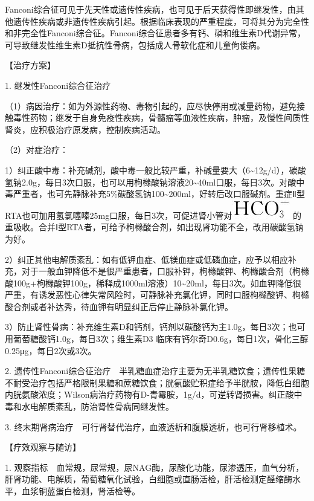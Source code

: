 Fanconi综合征可见于先天性或遗传性疾病，也可见于后天获得性即继发性，由其他遗传性疾病或非遗传性疾病引起。根据临床表现的严重程度，可将其分为完全性和非完全性Fanconi综合征。Fanconi综合征患者多有钙、磷和维生素D代谢异常，可导致继发性维生素D抵抗性骨病，包括成人骨软化症和儿童佝偻病。

【治疗方案】

1. 继发性Fanconi综合征治疗

（1）病因治疗：如为外源性药物、毒物引起的，应尽快停用或减量药物，避免接触毒性药物；继发于自身免疫性疾病，骨髓瘤等血液性疾病，肿瘤，及慢性间质性肾炎，应积极治疗原发病，控制疾病活动。

（2）对症治疗：

1）纠正酸中毒：补充碱剂，酸中毒一般比较严重，补碱量要大（6\textasciitilde{}12g/d），碳酸氢钠2.0g，每日3次口服，也可以用枸橼酸钠溶液20\textasciitilde{}40ml口服，每日3次。对酸中毒严重者，也可先静脉补充5\%碳酸氢钠100\textasciitilde{}200ml，好转后改口服碱剂。重症Ⅱ型RTA也可加用氢氯噻嗪25mg口服，每日3次，可促进肾小管对\includegraphics{./images/Image00128.jpg}
的重吸收。合并Ⅰ型RTA者，可给予枸橼酸合剂，如出现肾功能不全，改用碳酸氢钠为好。

2）纠正其他电解质紊乱：如有低钾血症、低镁血症或低磷血症，应予以相应补充，对于一般血钾降低不是很严重患者，口服补钾，枸橼酸钾、枸橼酸合剂（枸橼酸100g+枸橼酸钾100g，稀释成1000ml溶液）10\textasciitilde{}20ml，每日3次。如血钾降低很严重，有诱发恶性心律失常风险时，可静脉补充氯化钾，同时口服枸橼酸钾、枸橼酸合剂或者补达秀，待血钾有明显纠正后停止静脉补氯化钾。

3）防止肾性骨病：补充维生素D和钙剂，钙剂以碳酸钙为主1.0g，每日3次；也可用葡萄糖酸钙1.0g，每日3次；维生素D{3}
临床有钙尔奇D0.6g，每日1次，骨化三醇0.25μg，每日2次或3次。

2.
遗传性Fanconi综合征治疗　半乳糖血症治疗主要为无半乳糖饮食；遗传性果糖不耐受治疗包括严格限制果糖和蔗糖饮食；胱氨酸贮积症给予半胱胺，降低白细胞内胱氨酸浓度；Wilson病治疗药物有D-青霉胺，1g/d，可逆转肾损害。纠正酸中毒和水电解质紊乱，防治肾性骨病同继发性。

3. 终末期肾病治疗　可行肾替代治疗，血液透析和腹膜透析，也可行肾移植术。

【疗效观察与随访】

1.
观察指标　血常规，尿常规，尿NAG酶，尿酸化功能，尿渗透压，血气分析，肝肾功能、电解质，葡萄糖氧化试验，白细胞或直肠活检，肝活检测定醛缩酶水平，血浆铜蓝蛋白检测，肾活检等。

